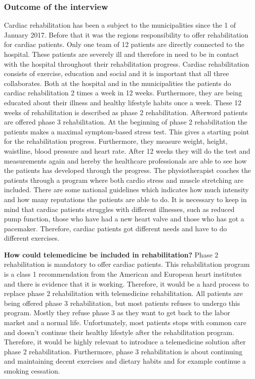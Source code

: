 \subsubsection{Outcome of the interview} 
Cardiac rehabilitation has been a subject to the municipalities since the 1 of January 2017. Before that it was the regions responsibility to offer rehabilitation for cardiac patients. Only one team of 12 patients are directly connected to the hospital. These patients are severely ill and therefore in need to be in contact with the hospital throughout their rehabilitation progress. Cardiac rehabilitation consists of exercise, education and social and it is important that all three collaborates. Both at the hospital and in the municipalities the patients do cardiac rehabilitation 2 times a week in 12 weeks. Furthermore, they are being educated about their illness and healthy lifestyle habits once a week. These 12 weeks of rehabilitation is described as phase 2 rehabilitation. Afterword patients are offered phase 3 rehabilitation. At the beginning of phase 2 rehabilitation the patients makes a maximal symptom-based stress test. This gives a starting point for the rehabilitation progress. Furthermore, they measure weight, height, waistline, blood pressure and heart rate. After 12 weeks they will do the test and measurements again and hereby the healthcare professionals are able to see how the patients has developed through the progress. The physiotherapist coaches the patients through a program where both cardio stress and muscle stretching are included. There are some national guidelines which indicates how much intensity and how many reputations the patients are able to do. It is necessary to keep in mind that cardiac patients struggles with different illnesses, such as reduced pump function, those who have had a new heart valve and those who has got a pacemaker. Therefore, cardiac patients got different needs and have to do different exercises.  

\textbf{How could telemedicine be included in rehabilitation?} \newline 
Phase 2 rehabilitation is mandatory to offer cardiac patients. This rehabilitation program is a class 1 recommendation from the American and European heart institutes and there is evidence that it is working. Therefore, it would be a hard process to replace phase 2 rehabilitation with telemedicine rehabilitation. All patients are being offered phase 3 rehabilitation, but most patients refuses to undergo this program. Mostly they refuse phase 3 as they want to get back to the labor market and a normal life. Unfortunately, most patients stops with common care and doesn’t continue their healthy lifestyle after the rehabilitation program. Therefore, it would be highly relevant to introduce a telemedicine solution after phase 2 rehabilitation. Furthermore, phase 3 rehabilitation is about continuing and maintaining decent exercises and dietary habits and for example continue a smoking cessation. 

